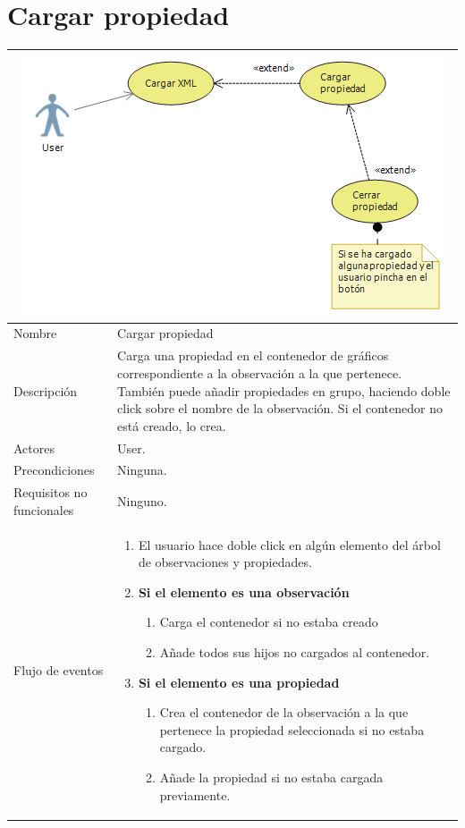 \section{Cargar propiedad}
\begin{table}[H]
	\begin{center}
		\begin{tabular}{|l*{1}{p{10cm}}|}
			
			\multicolumn{2}{c}{\includegraphics[width=0.6\linewidth]{./Figures/CargarPropiedad.png}} \\
			\hline
		    Nombre                     & Cargar propiedad \\
		    Descripci\'on              & Carga una propiedad en el contenedor de gr\'aficos
		    							 correspondiente a la observaci\'on a la que pertenece.
		    							 Tambi\'en puede a\~nadir propiedades en grupo, haciendo
		    							 doble click sobre el nombre de la observaci\'on. Si
		    							 el contenedor no est\'a creado, lo crea.  \\ 
		    Actores                    & User.  \\
		    Precondiciones             & Ninguna.  \\
		    Requisitos no funcionales  & Ninguno.  \\
		    Flujo de eventos           & \begin{enumerate}
		    								\item El usuario hace doble click en alg\'un elemento
		    									  del \'arbol de observaciones y propiedades.
		    								\item \textbf{Si el elemento es una observaci\'on}
		    								\begin{enumerate}
		    									\item Carga el contenedor si no estaba creado
		    									\item A\~nade todos sus hijos no cargados al
		    										  contenedor.
		    								\end{enumerate}
		    								\item \textbf{Si el elemento es una propiedad}
		    								\begin{enumerate}
			    								\item Crea el contenedor de la observaci\'on
			    									  a la que pertenece la propiedad seleccionada
			    									  si no estaba cargado.
			    								\item A\~nade la propiedad si no estaba cargada
			    									  previamente.
			    									  

\end{enumerate}
\end{enumerate}
\end{tabular}
\end{center}
\end{table}
